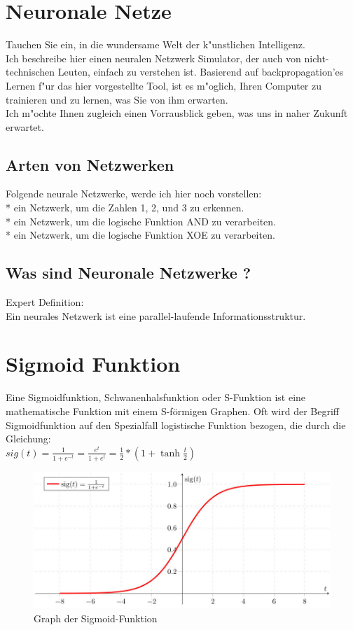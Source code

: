 \newpage
\chapter{Neuronale Netze}
Tauchen Sie ein, in die wundersame Welt der k"unstlichen Intelligenz. \\
Ich beschreibe hier einen neuralen Netzwerk Simulator, der auch von nicht-technischen Leuten,
einfach zu verstehen ist.
Basierend auf backpropagation'es Lernen f"ur das hier vorgestellte Tool, ist es m"oglich,
Ihren Computer zu trainieren und zu lernen, was Sie von ihm erwarten. \\
Ich m"ochte Ihnen zugleich einen Vorrausblick geben, was uns in naher Zukunft erwartet. \\

\section{Arten von Netzwerken}
Folgende neurale Netzwerke, werde ich hier noch vorstellen:\\
* ein Netzwerk, um die Zahlen 1, 2, und 3 zu erkennen. \\
* ein Netzwerk, um die logische Funktion AND zu verarbeiten. \\
* ein Netzwerk, um die logische Funktion XOE zu verarbeiten. \\

\section{Was sind Neuronale Netzwerke ?}
Expert Definition: \\
Ein neurales Netzwerk ist eine parallel-laufende Informationsstruktur.

\chapter{Sigmoid Funktion}
Eine Sigmoidfunktion, Schwanenhalsfunktion oder S-Funktion ist eine mathematische Funktion mit einem
S-förmigen Graphen.
Oft wird der Begriff Sigmoidfunktion auf den Spezialfall logistische Funktion bezogen,
die durch die Gleichung:\\
{\Large{$sig(t) = \frac{1}{1+e^{-t}} = \frac{e^t}{1 + e^t} = \frac{1}{2}*(1 + \tanh \frac{t}{2})$}}

\begin{figure}[h!]
\includegraphics[width=0.7\linewidth]{pics/Sigmoid}
\caption{Graph der Sigmoid-Funktion}
\label{fig:Sigmoid}
\end{figure}
